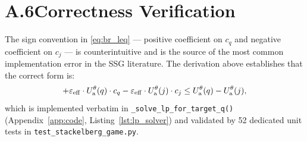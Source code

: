 \section*{A.6\quad Correctness Verification}

The sign convention in \cref{eq:br_leq} — positive coefficient on $c_q$
and negative coefficient on $c_j$ — is counterintuitive and is the
source of the most common implementation error in the SSG literature.
The derivation above establishes that the correct form is:
\begin{equation*}
  +\varepsilon_\mathrm{eff} \cdot U_{\mathrm{a}}^\theta(q) \cdot c_q
  - \varepsilon_\mathrm{eff} \cdot U_{\mathrm{a}}^\theta(j) \cdot c_j
  \leq U_{\mathrm{a}}^\theta(q) - U_{\mathrm{a}}^\theta(j),
\end{equation*}
which is implemented verbatim in \texttt{\_solve\_lp\_for\_target\_q()}
(Appendix~\ref{app:code}, Listing~\ref{lst:lp_solver}) and validated
by 52 dedicated unit tests in \texttt{test\_stackelberg\_game.py}.
